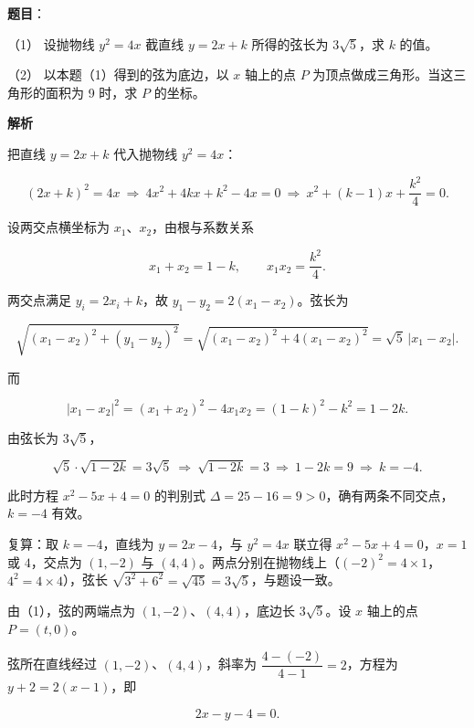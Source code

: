 \begin{answer}

\textbf{题目}：

（1） 设抛物线 $y^2=4x$ 截直线 $y=2x+k$ 所得的弦长为 $3\sqrt5$，求 $k$ 的值。

（2） 以本题（1）得到的弦为底边，以 $x$ 轴上的点 $P$ 为顶点做成三角形。当这三角形的面积为 9 时，求 $P$ 的坐标。

\textbf{解析}


把直线 $y=2x+k$ 代入抛物线 $y^2=4x$：

\nopagebreak[4]
\[
(2x+k)^2=4x
\ \Longrightarrow\
4x^2+4kx+k^2-4x=0
\ \Longrightarrow\
x^2+(k-1)x+\frac{k^2}{4}=0.
\]

设两交点横坐标为 $x_1$、$x_2$，由根与系数关系

\nopagebreak[4]
\[
x_1+x_2=1-k,\qquad x_1x_2=\frac{k^2}{4}.
\]

两交点满足 $y_i=2x_i+k$，故 $y_1-y_2=2(x_1-x_2)$。弦长为

\nopagebreak[4]
\[
\sqrt{(x_1-x_2)^2+(y_1-y_2)^2}
=\sqrt{(x_1-x_2)^2+4(x_1-x_2)^2}
=\sqrt5\,\lvert x_1-x_2\rvert.
\]

而

\nopagebreak[4]
\[
\lvert x_1-x_2\rvert^2=(x_1+x_2)^2-4x_1x_2=(1-k)^2-k^2=1-2k.
\]

由弦长为 $3\sqrt5$，

\nopagebreak[4]
\[
\sqrt5\cdot\sqrt{1-2k}=3\sqrt5
\ \Longrightarrow\
\sqrt{1-2k}=3
\ \Longrightarrow\
1-2k=9
\ \Longrightarrow\
k=-4.
\]

此时方程 $x^2-5x+4=0$ 的判别式 $\Delta=25-16=9>0$，确有两条不同交点，$k=-4$ 有效。

复算：取 $k=-4$，直线为 $y=2x-4$，与 $y^2=4x$ 联立得 $x^2-5x+4=0$，$x=1$ 或 $4$，交点为 $(1,-2)$ 与 $(4,4)$。两点分别在抛物线上（$(-2)^2=4\times1$，$4^2=4\times4$），弦长 $\sqrt{3^2+6^2}=\sqrt{45}=3\sqrt5$，与题设一致。


由（1），弦的两端点为 $(1,-2)$、$(4,4)$，底边长 $3\sqrt5$。设 $x$ 轴上的点 $P=(t,0)$。

弦所在直线经过 $(1,-2)$、$(4,4)$，斜率为 $\dfrac{4-(-2)}{4-1}=2$，方程为 $y+2=2(x-1)$，即

\nopagebreak[4]
\[
2x-y-4=0.
\]


\end{answer}
